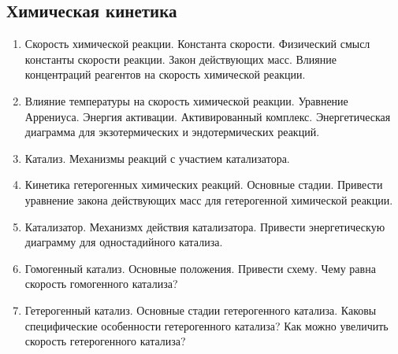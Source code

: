 \subsection{Химическая кинетика}
\begin{enumerate}
\item 
Скорость химической реакции. Константа скорости. Физический смысл константы скорости реакции. Закон действующих масс. Влияние концентраций реагентов на скорость химической реакции.
 
\item 
Влияние температуры на скорость химической реакции. Уравнение Аррениуса. Энергия активации. Активированный комплекс. Энергетическая диаграмма для экзотермических и эндотермических реакций.
 
\item 
Катализ. Механизмы реакций с участием катализатора.
 
\item 
Кинетика гетерогенных химических реакций. Основные стадии. Привести уравнение закона действующих масс для  гетерогенной химической реакции.

\item
Катализатор. Механизмх действия катализатора. Привести энергетическую диаграмму для одностадийного катализа.

\item
Гомогенный катализ. Основные положения. Привести схему. Чему равна скорость гомогенного катализа?

\item
Гетерогенный катализ. Основные стадии гетерогенного катализа. Каковы специфические особенности гетерогенного катализа? Как можно увеличить скорость гетерогенного катализа?

\end{enumerate}